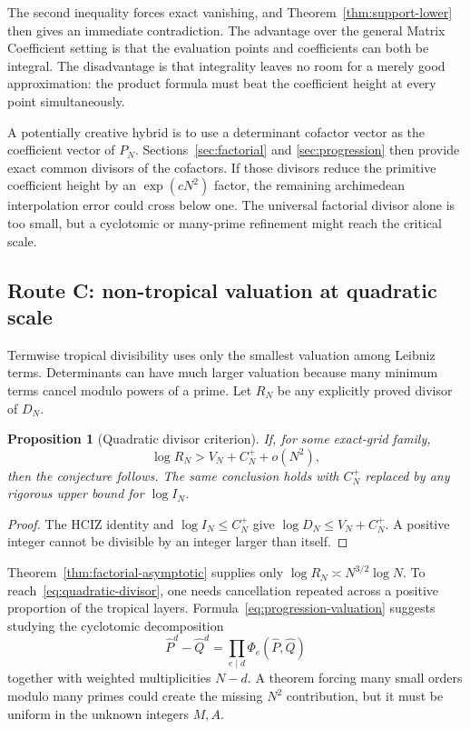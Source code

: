 \documentclass[11pt]{article}
\newcommand{\1}{\mathbf 1}
\theoremstyle{plain}
\newtheorem{proposition}[theorem]{Proposition}
\theoremstyle{definition}
\theoremstyle{remark}
\begin{document}
The second inequality forces exact vanishing, and
Theorem~\ref{thm:support-lower} then gives an immediate contradiction.  The
advantage over the general Matrix Coefficient setting is that the evaluation
points and coefficients can both be integral.  The disadvantage is that
integrality leaves no room for a merely good approximation: the product
formula must beat the coefficient height at every point simultaneously.

A potentially creative hybrid is to use a determinant cofactor vector as the
coefficient vector of $P_N$.  Sections~\ref{sec:factorial} and
\ref{sec:progression} then provide exact common divisors of the cofactors.
If those divisors reduce the primitive coefficient height by an
$\exp(cN^2)$ factor, the remaining archimedean interpolation error could cross
below one.  The universal factorial divisor alone is too small, but a
cyclotomic or many-prime refinement might reach the critical scale.

\subsection{Route C: non-tropical valuation at quadratic scale}

Termwise tropical divisibility uses only the smallest valuation among
Leibniz terms.  Determinants can have much larger valuation because many
minimum terms cancel modulo powers of a prime.  Let $R_N$ be any explicitly
proved divisor of $D_N$.

\begin{proposition}[Quadratic divisor criterion]\label{prop:quadratic-divisor}
If, for some exact-grid family,
\begin{equation}\label{eq:quadratic-divisor}
 \log R_N>V_N+C_N^++o(N^2),
\end{equation}
then the conjecture follows.
The same conclusion holds with $C_N^+$ replaced by any rigorous upper bound
for $\log I_N$.
\end{proposition}

\begin{proof}
The HCIZ identity and $\log I_N\le C_N^+$ give
$\log D_N\le V_N+C_N^+$.  A positive integer cannot be divisible by an
integer larger than itself.
\end{proof}

Theorem~\ref{thm:factorial-asymptotic} supplies only
$\log R_N\asymp N^{3/2}\log N$.  To reach~\eqref{eq:quadratic-divisor}, one
needs cancellation repeated across a positive proportion of the tropical
layers.  Formula~\eqref{eq:progression-valuation} suggests studying the
cyclotomic decomposition
\[
 \widehat P^d-\widehat Q^d
 =\prod_{e\mid d}\Phi_e(\widehat P,\widehat Q)
\]
together with weighted multiplicities $N-d$.  A theorem forcing many small
orders modulo many primes could create the missing $N^2$ contribution, but it
must be uniform in the unknown integers $M,A$.
\end{document}
